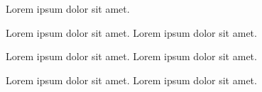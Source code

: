 Lorem ipsum dolor sit amet.

Lorem ipsum dolor sit amet. Lorem ipsum dolor sit amet.

Lorem ipsum dolor sit amet.
Lorem ipsum dolor sit amet.


Lorem ipsum dolor sit amet.
Lorem ipsum dolor sit amet.


